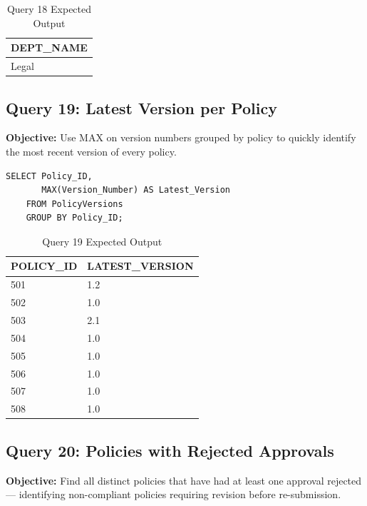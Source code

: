 \documentclass[conference]{IEEEtran}
\begin{document}
\begin{table}[H]
\centering
\caption{Query 18 Expected Output}
\begin{tabular}{|l|}
\hline
\textbf{DEPT\_NAME} \\
\hline
Legal \\
\hline
\end{tabular}
\end{table}

\subsection{Query 19: Latest Version per Policy}

\textbf{Objective:} Use MAX on version numbers grouped by policy to quickly identify the most recent version of every policy.

\begin{lstlisting}[style=sqlstyle, caption={Query 19: Latest Versions (GROUP BY + MAX)}]
SELECT Policy_ID,
       MAX(Version_Number) AS Latest_Version
    FROM PolicyVersions
    GROUP BY Policy_ID;
\end{lstlisting}

\begin{table}[H]
\centering
\caption{Query 19 Expected Output}
\begin{tabular}{|l|l|}
\hline
\textbf{POLICY\_ID} & \textbf{LATEST\_VERSION} \\
\hline
501 & 1.2 \\
502 & 1.0 \\
503 & 2.1 \\
504 & 1.0 \\
505 & 1.0 \\
506 & 1.0 \\
507 & 1.0 \\
508 & 1.0 \\
\hline
\end{tabular}
\end{table}

\subsection{Query 20: Policies with Rejected Approvals}

\textbf{Objective:} Find all distinct policies that have had at least one approval rejected — identifying non-compliant policies requiring revision before re-submission.
\end{document}
